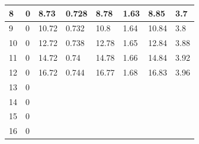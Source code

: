 \documentclass[10pt, a4j, dvipdfmx]{jarticle}
\begin{document}
\begin{table}[H]
\begin{tabular}{|l|l||l|l||l|l||l|l|}
        8                         & 0              & 8.73                      & 0.728          & 8.78                      & 1.63            & 8.85                      & 3.7             \\ \hline
        9                         & 0              & 10.72                     & 0.732          & 10.8                      & 1.64            & 10.84                     & 3.8             \\ \hline
        10                        & 0              & 12.72                     & 0.738          & 12.78                     & 1.65            & 12.84                     & 3.88            \\ \hline
        11                        & 0              & 14.72                     & 0.74           & 14.78                     & 1.66            & 14.84                     & 3.92            \\ \hline
        12                        & 0              & 16.72                     & 0.744          & 16.77                     & 1.68            & 16.83                     & 3.96            \\ \hline
        13                        & 0              &                           &                &                           &                 &                           &                 \\ \hline
        14                        & 0              &                           &                &                           &                 &                           &                 \\ \hline
        15                        & 0              &                           &                &                           &                 &                           &                 \\ \hline
        16                        & 0              &                           &                &                           &                 &                           &                 \\ \hline
        \end{tabular}
    \end{table}
\end{document}
